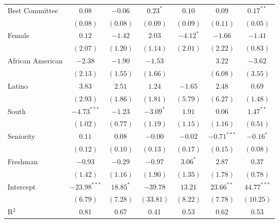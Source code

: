 \documentclass[12pt]{article}
\begin{document}
\begin{table}
\begin{center}
\begin{tabular}{l c c c c c c }
			Best Committee          & $0.08$         & $-0.06$      & $0.23^{*}$    & $0.10$       & $0.09$        & $0.17^{**}$   \\
			& $(0.08)$       & $(0.08)$     & $(0.09)$      & $(0.09)$     & $(0.11)$      & $(0.05)$      \\
			Female                 & $0.12$         & $-1.42$      & $2.03$        & $-4.12^{*}$  & $-1.66$       & $-1.41$       \\
			& $(2.07)$       & $(1.20)$     & $(1.14)$      & $(2.01)$     & $(2.22)$      & $(0.83)$      \\
			African American                   & $-2.38$        & $-1.90$      & $-1.53$       &              & $3.22$        & $-3.62$       \\
			& $(2.13)$       & $(1.55)$     & $(1.66)$      &              & $(6.08)$      & $(3.55)$      \\
			Latino                 & $3.83$         & $2.51$       & $1.24$        & $-1.65$      & $2.48$        & $0.69$        \\
			& $(2.93)$       & $(1.86)$     & $(1.81)$      & $(5.79)$     & $(6.27)$      & $(1.48)$      \\
			South                  & $-4.73^{***}$  & $-1.23$      & $-3.09^{*}$   & $1.91$       & $0.06$        & $1.47^{**}$   \\
			& $(1.02)$       & $(0.77)$     & $(1.19)$      & $(1.15)$     & $(1.16)$      & $(0.51)$      \\
			Seniority              & $0.11$         & $0.08$       & $-0.00$       & $-0.02$      & $-0.71^{***}$ & $-0.16^{*}$   \\
			& $(0.12)$       & $(0.10)$     & $(0.13)$      & $(0.17)$     & $(0.15)$      & $(0.08)$      \\
			Freshman               & $-0.93$        & $-0.29$      & $-0.97$       & $3.06^{*}$   & $2.87$        & $0.37$        \\
			& $(1.42)$       & $(1.16)$     & $(1.90)$      & $(1.35)$     & $(1.78)$      & $(0.78)$      \\
			Intercept            & $-23.98^{***}$ & $18.85^{*}$  & $-39.78$      & $13.21$      & $23.66^{**}$  & $44.77^{***}$ \\
			& $(6.79)$       & $(7.28)$     & $(33.81)$     & $(8.22)$     & $(7.78)$      & $(10.25)$     \\
			\hline
			R$^2$                  & 0.81           & 0.67         & 0.41          & 0.53         & 0.62          & 0.53          \\

\end{tabular}
\end{center}
\end{table}
\end{document}
